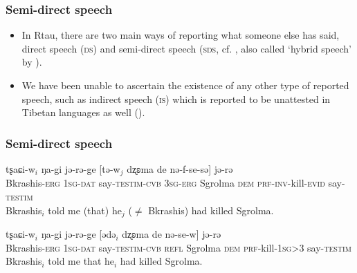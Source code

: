 \documentclass[xcolor=table]{beamer}
\newcommand{\ipa}[1]{{\phon #1}} %
\newcommand{\ipapl}[1]{{\phondroit #1}}
\newcommand{\conv}{\textsc{cvb}}
\newcommand{\const}{\textsc{testim}}
\newcommand{\dat}{\textsc{dat}}
\newcommand{\dem}{\textsc{dem}}
\newcommand{\erg}{\textsc{erg}}
\newcommand{\evid}{\textsc{evid}}
\newcommand{\inv}{\textsc{inv}}
\newcommand{\prf}{\textsc{prf}}
\newcommand{\refl}{\textsc{refl}}
\newcommand{\sg}{\textsc{sg}}
\begin{document}
\begin{frame}%
\frametitle{Semi-direct speech}

\begin{itemize}

\item In Rtau, there are two main ways of reporting what someone else has said, direct speech (\textsc{ds}) and semi-direct speech (\textsc{sds}, cf. \citealp{aikhenvald08semidirect}, also called `hybrid speech' by \citealp{tournadre08conjunct}). 


\item We have been unable to ascertain the existence of any other type of reported speech, such as indirect speech (\textsc{is}) which is reported to be unattested in Tibetan languages as well (\citealp{tournadre08conjunct}).

\end{itemize}

\end{frame}

\begin{frame}%
\frametitle{Semi-direct speech}

 

\begin{exe}
\ex \label{ex:1b}
\gll
	\ipa{tʂaɕi-w}$_i$ \ipa{ŋa-gi}	\ipa{jə-rə-ge} [\ipapl{tə-w}$_j$	\ipapl{dʐʚma} 	\ipapl{de} \ipapl{nə-f-se-sə}] \ipa{jə-rə}  \\
	{Bkrashis-\erg} {1\sg-\dat} {say-\const-\conv} {3\sg-\erg} Sgrolma {\dem} {\prf-\inv-kill-\evid}  say-\const\\ 
	\glt Bkrashis$_i$ told me (that) he$_j$ ($\ne$ Bkrashis) had killed Sgrolma.
\end{exe}

\begin{exe}
\ex \label{ex:1c}
\gll
	\ipa{tʂaɕi-w}$_i$ \ipa{ŋa-gi}	\ipa{jə-rə-ge} [\ipapl{ədə}$_i$	\ipapl{dʐʚma} 	\ipapl{de} 	\ipapl{nə-se-w}] \ipa{jə-rə}  \\
	{Bkrashis-\erg} {1\sg-\dat} {say-\const-\conv} {\refl} Sgrolma {\dem} {\prf-kill-1\sg>3} say-\const\\ 
	\glt Bkrashis$_i$ told me that he$_i$ had killed Sgrolma.
\end{exe}

\end{frame}
\end{document}
